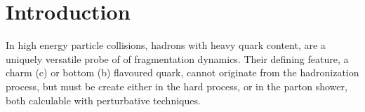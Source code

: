 \documentclass[paper.tex]{subfiles}
\begin{document}
\section{Introduction}
In high energy particle collisions, hadrons with heavy quark content, are a uniquely versatile probe of of fragmentation dynamics. Their defining feature, a charm (c) or bottom (b) flavoured quark, cannot originate from the hadronization process, but must be create either in the hard process, or in the parton shower, both calculable with perturbative techniques.  

\end{document}
